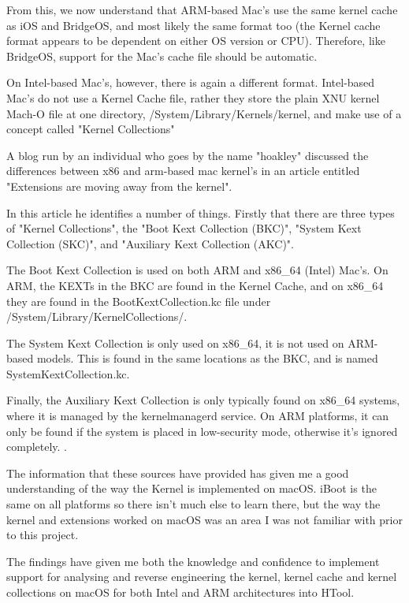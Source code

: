 From this, we now understand that ARM-based Mac's use the same kernel cache as iOS and BridgeOS, and most likely the same format too (the Kernel cache format appears to be dependent on either OS version or CPU). Therefore, like BridgeOS, support for the Mac's cache file should be automatic. 

On Intel-based Mac's, however, there is again a different format. Intel-based Mac's do not use a Kernel Cache file, rather they store the plain XNU kernel Mach-O file at one directory, /System/Library/Kernels/kernel, and make use of a concept called "Kernel Collections"

A blog run by an individual who goes by the name "hoakley" discussed the differences between x86 and arm-based mac kernel's in an article entitled "Extensions are moving away from the kernel".

In this article he identifies a number of things. Firstly that there are three types of "Kernel Collections", the "Boot Kext Collection (BKC)", "System Kext Collection (SKC)", and "Auxiliary Kext Collection (AKC)".

The Boot Kext Collection is used on both ARM and x86\_64 (Intel) Mac's. On ARM, the KEXTs in the BKC are found in the Kernel Cache, and on x86\_64 they are found in the BootKextCollection.kc file under /System/Library/KernelCollections/.

The System Kext Collection is only used on x86\_64, it is not used on ARM-based models. This is found in the same locations as the BKC, and is named SystemKextCollection.kc. 

Finally, the Auxiliary Kext Collection is only typically found on x86\_64 systems, where it is managed by the kernelmanagerd service. On ARM platforms, it can only be found if the system is placed in low-security mode, otherwise it's ignored completely. \cite{hoakley-kexts}.



The information that these sources have provided has given me a good understanding of the way the Kernel is implemented on macOS. iBoot is the same on all platforms so there isn't much else to learn there, but the way the kernel and extensions worked on macOS was an area I was not familiar with prior to this project.


The findings have given me both the knowledge and confidence to implement support for analysing and reverse engineering the kernel, kernel cache and kernel collections on macOS for both Intel and ARM architectures into HTool. 

